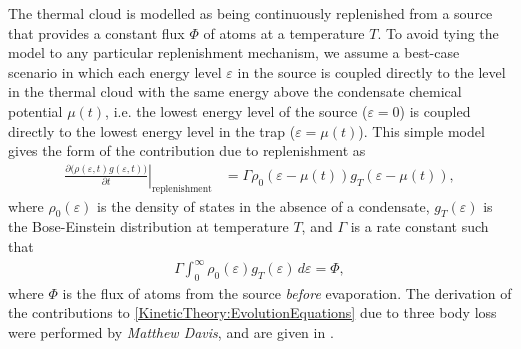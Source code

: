 The thermal cloud is modelled as being continuously replenished from a source that provides a constant flux $\Phi$ of atoms at a temperature $T$.  To avoid tying the model to any particular replenishment mechanism, we assume a best-case scenario in which each energy level $\varepsilon$ in the source is coupled directly to the level in the thermal cloud with the same energy above the condensate chemical potential $\mu(t)$, i.e. the lowest energy level of the source ($\varepsilon=0$) is coupled directly to the lowest energy level in the trap ($\varepsilon = \mu(t)$).  This simple model gives the form of the contribution due to replenishment as
\begin{align}
    \left. \frac{\partial \big(\rho(\varepsilon, t) g(\varepsilon, t)\big)}{\partial t} \right|_\text{replenishment} &= \Gamma \rho_0(\varepsilon - \mu(t)) g_T(\varepsilon - \mu(t)),
    \label{KineticTheory:ReplenishmentProcess}
\end{align}
where $\rho_0(\varepsilon)$ is the density of states in the absence of a condensate, $g_T(\varepsilon)$ is the Bose-Einstein  distribution at temperature $T$, and $\Gamma$ is a rate constant such that
\begin{align}
    \Gamma \int_0^\infty \rho_0(\varepsilon) g_T(\varepsilon)\, d\varepsilon = \Phi,
    \label{KineticTheory:GammaPhiRelation}
\end{align}
where $\Phi$ is the flux of atoms from the source \emph{before} evaporation.  The derivation of the contributions to \eqref{KineticTheory:EvolutionEquations} due to three body loss were performed by \emph{Matthew Davis}, and are given in .

\parasep

